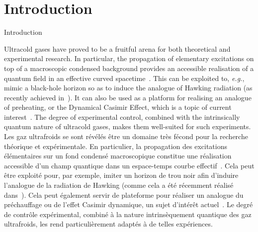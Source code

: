 \documentclass[aps,prd,notitlepage,amsfonts,amssymb,amsmath,nofootinbib,superscriptaddress,longbibliography]{revtex4-2}
\newcommand{\trad}[1]{\textcolor{tradcolor}{#1}}
\begin{document}
\maketitle




\section{Introduction}
\trad{Introduction}

Ultracold gases have proved to be a fruitful arena for both theoretical and experimental research.
In particular, the propagation of elementary excitations on top of a macroscopic condensed background provides an accessible realisation of a quantum field in an effective curved spacetime~\cite{Garay2000,LivingReview}.
This can be exploited to, {\it e.g.}, mimic a black-hole horizon so as to induce the analogue of Hawking radiation (as recently achieved in~\cite{deNova2019}).
It can also be used as a platform for realising an analogue of preheating, or the Dynamical Casimir Effect, which is a topic of current interest~\cite{Jaskula2012, silkePrimaryThermalisation2022,carusottoNumericalStudies2022}. The degree of experimental control, combined with the intrinsically quantum nature of ultracold gases, makes them well-suited for such experiments.
\trad{
Les gaz ultrafroids se sont révélés être un domaine très fécond pour la recherche théorique et expérimentale. 
En particulier, la propagation des excitations élémentaires sur un fond condensé macroscopique constitue une réalisation accessible d'un champ quantique dans un espace-temps courbe effectif~\cite{Garay2000,LivingReview}. 
Cela peut être exploité pour, par exemple, imiter un horizon de trou noir afin d'induire l'analogue de la radiation de Hawking (comme cela a été récemment réalisé dans~\cite{deNova2019}). 
Cela peut également servir de plateforme pour réaliser un analogue du préchauffage ou de l'effet Casimir dynamique, un sujet d'intérêt actuel~\cite{Jaskula2012, silkePrimaryThermalisation2022,carusottoNumericalStudies2022}. Le degré de contrôle expérimental, combiné à la nature intrinsèquement quantique des gaz ultrafroids, les rend particulièrement adaptés à de telles expériences.
}
\end{document}
